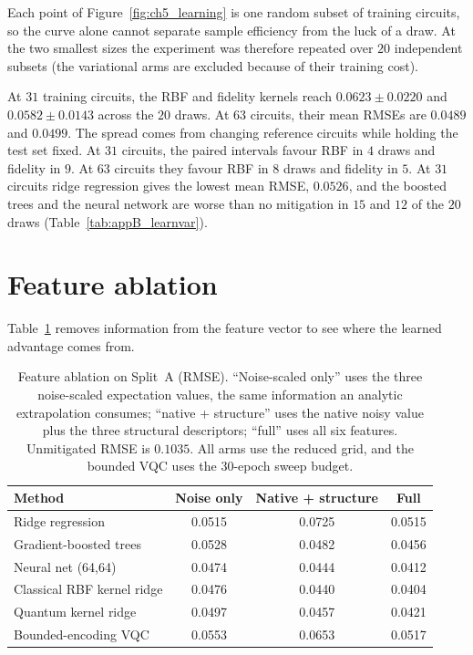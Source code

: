 \documentclass[Thesis.tex]{subfiles}
\begin{document}
Each point of Figure~\ref{fig:ch5_learning} is one random subset of training
circuits, so the curve alone cannot separate sample efficiency from the luck of a
draw. At the two smallest sizes the experiment was therefore repeated over $20$
independent subsets (the variational arms are excluded because of their training cost).

At $31$ training circuits, the RBF and fidelity kernels reach
$0.0623\pm0.0220$ and
$0.0582\pm0.0143$ across the
$20$ draws. At $63$ circuits, their mean RMSEs are
$0.0489$ and $0.0499$.
The spread comes from changing reference circuits while holding the test set fixed.
At $31$ circuits, the paired intervals favour RBF in
$4$
draws and fidelity in
$9$. At $63$ circuits they favour RBF in $8$ draws and fidelity in $5$. At $31$
circuits ridge regression gives the lowest mean RMSE, $0.0526$, and the boosted trees
and the neural network are worse than no mitigation in $15$ and $12$ of the $20$ draws
(Table~\ref{tab:appB_learnvar}).

\section{Feature ablation}\label{sec:ch5_ablation}

Table~\ref{tab:ch5_ablation} removes information from the feature vector to see where
the learned advantage comes from.

\begin{table}[htbp]
\centering
\caption[Feature ablation on Split~A]{Feature ablation on Split~A (RMSE). ``Noise-scaled only'' uses the three
noise-scaled expectation values, the same information an analytic extrapolation
consumes; ``native + structure'' uses the native noisy value plus the three structural descriptors; ``full'' uses all six features. Unmitigated RMSE is $0.1035$.
All arms use the reduced grid, and the bounded VQC uses the 30-epoch sweep budget.}
\label{tab:ch5_ablation}
\small
\begin{tabular}{lccc}
\toprule
\textbf{Method} & \textbf{Noise only} & \textbf{Native + structure}
& \textbf{Full} \\
\midrule
Ridge regression & 0.0515 & 0.0725 & 0.0515 \\
Gradient-boosted trees & 0.0528 & 0.0482 & 0.0456 \\
Neural net (64,64) & 0.0474 & 0.0444 & 0.0412 \\
Classical RBF kernel ridge & 0.0476 & 0.0440 & 0.0404 \\
Quantum kernel ridge & 0.0497 & 0.0457 & 0.0421 \\
Bounded-encoding VQC & 0.0553 & 0.0653 & 0.0517 \\
\bottomrule
\end{tabular}
\end{table}
\end{document}
